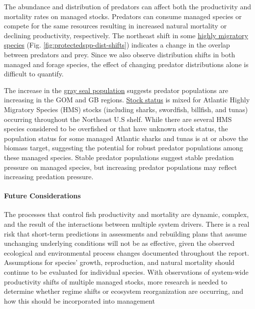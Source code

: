 \documentclass[
  10pt,
]{article}
\begin{document}
The abundance and distribution of predators can affect both the productivity and mortality rates on managed stocks. Predators can consume managed species or compete for the same resources resulting in increased natural mortality or declining productivity, respectively. The northeast shift in some \href{https://noaa-edab.github.io/catalog/HMS_species_distribution.html}{highly migratory species} (Fig. \ref{fig:protectedspp-dist-shifts}) indicates a change in the overlap between predators and prey. Since we also observe distribution shifts in both managed and forage species, the effect of changing predator distributions alone is difficult to quantify.

The increase in the \href{https://noaa-edab.github.io/catalog/grayseal.html}{gray seal population} suggests predator populations are increasing in the GOM and GB regions. \href{https://noaa-edab.github.io/catalog/hms_stock_status.html}{Stock status} is mixed for Atlantic Highly Migratory Species (HMS) stocks (including sharks, swordfish, billfish, and tunas) occurring throughout the Northeast U.S shelf. While there are several HMS species considered to be overfished or that have unknown stock status, the population status for some managed Atlantic sharks and tunas is at or above the biomass target, suggesting the potential for robust predator populations among these managed species. Stable predator populations suggest stable predation pressure on managed species, but increasing predator populations may reflect increasing predation pressure.

\hypertarget{future-considerations-2}{%
\paragraph{Future Considerations}\label{future-considerations-2}}

The processes that control fish productivity and mortality are dynamic, complex, and the result of the interactions between multiple system drivers. There is a real risk that short-term predictions in assessments and rebuilding plans that assume unchanging underlying conditions will not be as effective, given the observed ecological and environmental process changes documented throughout the report. Assumptions for species' growth, reproduction, and natural mortality should continue to be evaluated for individual species. With observations of system-wide productivity shifts of multiple managed stocks, more research is needed to determine whether regime shifts or ecosystem reorganization are occurring, and how this should be incorporated into management
\end{document}

